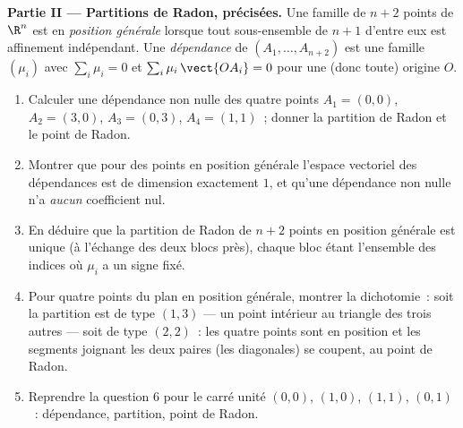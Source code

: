 \begin{problem}
\medskip
\noindent\textbf{Partie II --- Partitions de Radon, précisées.} Une
famille de $n + 2$ points de $\R^n$ est en \emph{position
générale} lorsque tout sous-ensemble de $n + 1$ d'entre eux est
affinement indépendant. Une \emph{dépendance } de $(A_1, \dots,
A_{n+2})$ est une famille $(\mu_i)$ avec $\sum_i \mu_i = 0$ et $\sum_i
\mu_i\,\vect{OA_i} = 0$ pour une (donc toute) origine $O$.
\begin{enumerate}[resume]
  \item Calculer une dépendance  non nulle des quatre
        points $A_1 = (0,0)$, $A_2 = (3,0)$, $A_3 = (0,3)$,
        $A_4 = (1,1)$~; donner la partition de Radon et le point
        de Radon.
  \item Montrer que pour des points en position générale l'espace
        vectoriel des dépendances  est de dimension exactement
        $1$, et qu'une dépendance non nulle n'a \emph{aucun}
        coefficient nul.
  \item En déduire que la partition de Radon de $n + 2$ points en
        position générale est unique (à l'échange des deux
        blocs près), chaque bloc étant l'ensemble des indices où
        $\mu_i$ a un signe fixé.
  \item Pour quatre points du plan en position générale,
        montrer la dichotomie~: soit la partition est de type
        $(1, 3)$ --- un point intérieur au triangle
        des trois autres --- soit de type $(2, 2)$~: les quatre points
        sont en position  et les segments joignant les
        deux paires (les diagonales) se coupent, au point de Radon.
  \item Reprendre la question 6 pour le carré unité $(0,0)$,
        $(1,0)$, $(1,1)$, $(0,1)$~: dépendance, partition,
        point de Radon.
\end{enumerate}


\end{problem}
